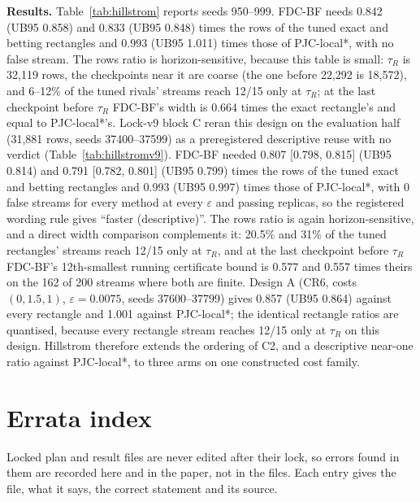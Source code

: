 \documentclass[sigconf,anonymous,review]{acmart}
\newcommand{\eps}{\varepsilon}
\begin{document}
\textbf{Results.} Table~\ref{tab:hillstrom} reports seeds 950--999. FDC-BF needs 0.842 (UB95 0.858) and 0.833 (UB95 0.848) times the rows of the tuned exact and betting rectangles and 0.993 (UB95 1.011) times those of PJC-local*, with no false stream. The rows ratio is horizon-sensitive, because this table is small: $\tau_R$ is 32,119 rows, the checkpoints near it are coarse (the one before 22,292 is 18,572), and 6--12\% of the tuned rivals' streams reach 12/15 only at $\tau_R$; at the last checkpoint before $\tau_R$ FDC-BF's width is 0.664 times the exact rectangle's and equal to PJC-local*'s. Lock-v9 block C reran this design on the evaluation half (31,881 rows, seeds 37400--37599) as a preregistered descriptive reuse with no verdict (Table~\ref{tab:hillstromv9}). FDC-BF needed 0.807 [0.798, 0.815] (UB95 0.814) and 0.791 [0.782, 0.801] (UB95 0.799) times the rows of the tuned exact and betting rectangles and 0.993 (UB95 0.997) times those of PJC-local*, with 0 false streams for every method at every $\eps$ and passing replicas, so the registered wording rule gives ``faster (descriptive)''. The rows ratio is again horizon-sensitive, and a direct width comparison complements it: 20.5\% and 31\% of the tuned rectangles' streams reach 12/15 only at $\tau_R$, and at the last checkpoint before $\tau_R$ FDC-BF's 12th-smallest running certificate bound is 0.577 and 0.557 times theirs on the 162 of 200 streams where both are finite. Design A (CR6, costs $(0, 1.5, 1)$, $\eps = 0.0075$, seeds 37600--37799) gives 0.857 (UB95 0.864) against every rectangle and 1.001 against PJC-local*; the identical rectangle ratios are quantised, because every rectangle stream reaches 12/15 only at $\tau_R$ on this design. Hillstrom therefore extends the ordering of C2, and a descriptive near-one ratio against PJC-local*, to three arms on one constructed cost family.





\section{Errata index}\label{app:errata}

Locked plan and result files are never edited after their lock, so errors found in them are recorded here and in the paper, not in the files. Each entry gives the file, what it says, the correct statement and its source.
\end{document}

